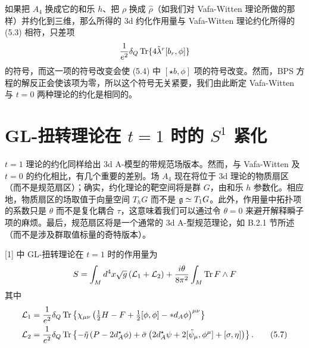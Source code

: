
如果把 $A_4$ 换成它的和乐 $h$、把 $\rho$ 换成 $\hat\rho$（如我们对 Vafa-Witten 理论所做的那样）并约化到三维，那么所得的 3d 约化作用量与 Vafa-Witten 理论约化所得的 (5.3) 相符，只差项
\[
    \frac{1}{e^2}\delta_Q\operatorname{Tr}\{4\tilde\lambda^r[b_r,\phi]\}
\]
的符号，而这一项的符号改变会使 (5.4) 中 $[\star b,\phi]$ 项的符号改变。然而，BPS 方程的解反正会使该项为零，所以这个符号无关紧要，我们由此断定 Vafa-Witten 与 $t=0$ 两种理论的约化是相同的。


\section{GL-扭转理论在 \texorpdfstring{$t=1$}{t=1} 时的 \texorpdfstring{$S^1$}{S1} 紧化}

$t=1$ 理论的约化同样给出 3d A-模型的带规范场版本。然而，与 Vafa-Witten 及 $t=0$ 的约化相比，有几个重要的差别。场 $A_4$ 现在将位于 3d 理论的物质扇区（而不是规范扇区）；确实，约化理论的靶空间将是群 $G$，由和乐 $h$ 参数化。相应地，物质扇区的场取值于向量空间 $T_hG$ 而不是 $\mathfrak{g}\simeq T_1G$。此外，作用量中拓扑项的系数只是 $\theta$ 而不是复化耦合 $\tau$，这意味着我们可以通过令 $\theta=0$ 来避开解释瞬子项的麻烦。最后，规范扇区将是一个通常的 3d A-型规范理论，如 B.2.1 节所述（而不是涉及群取值标量的奇特版本）。


[1] 中 GL-扭转理论在 $t=1$ 时的作用量为
\[
    S = \int_Md^4x\sqrt{g}\left(\mathcal{L}_1+\mathcal{L}_2\right)
    + \frac{i\theta}{8\pi^2}\int_M\operatorname{Tr} F\wedge F
\]
其中
\begin{align}
    \mathcal{L}_1 &= \frac{1}{e^2}\delta_Q\operatorname{Tr}\left\{\chi_{\mu\nu}
        \left(\tfrac{1}{2} H - F + \tfrac{1}{2}[\phi,\phi] - \ast d_A\phi\right)^{\mu\nu}\right\} \notag\\
    \mathcal{L}_2 &= \frac{1}{e^2}\delta_Q\operatorname{Tr}\left\{-\tilde\eta\left(P - 2d_A^\star\phi\right)
        + \bar\sigma\left(2d_A^\star\psi + 2[\tilde\psi_\mu,\phi^\mu] + [\sigma,\eta]\right)\right\} . \tag{5.7}
\end{align}

